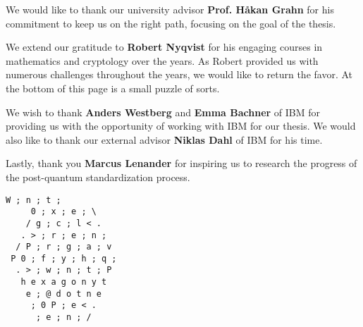 \acknowledgments

\noindent We would like to thank our university advisor \textbf{Prof. Håkan Grahn} for his commitment to keep us on the right path, focusing on the goal of the thesis.
\hfill\par\hfill\par
\noindent We extend our gratitude to \textbf{Robert Nyqvist} for his engaging courses in mathematics and cryptology over the years. As Robert provided us with numerous challenges throughout the years, we would like to return the favor. At the bottom of this page is a small puzzle of sorts.
\hfill\par\hfill\par
\noindent We wish to thank \textbf{Anders Westberg} and \textbf{Emma Bachner} of IBM for providing us with the opportunity of working with IBM for our thesis. We would also like to thank our external advisor \textbf{Niklas Dahl} of IBM for his time.
\hfill\par\hfill\par
\noindent Lastly, thank you \textbf{Marcus Lenander} for inspiring us to research the progress of the \gls{post-quantum} standardization process.

\vfill
\begin{center}
\begin{minipage}{4.5cm}
\linespread{0.8}
\begin{Verbatim}[fontsize=\small]
      W ; n ; t ;
     0 ; x ; e ; \
    / g ; c ; l < .
   . > ; r ; e ; n ;
  / P ; r ; g ; a ; v
 P 0 ; f ; y ; h ; q ;
  . > ; w ; n ; t ; P
   h e x a g o n y t
    e ; @ d o t n e
     ; 0 P ; e < .
      ; e ; n ; /
\end{Verbatim}
\end{minipage}
\end{center}

\cleardoublepage